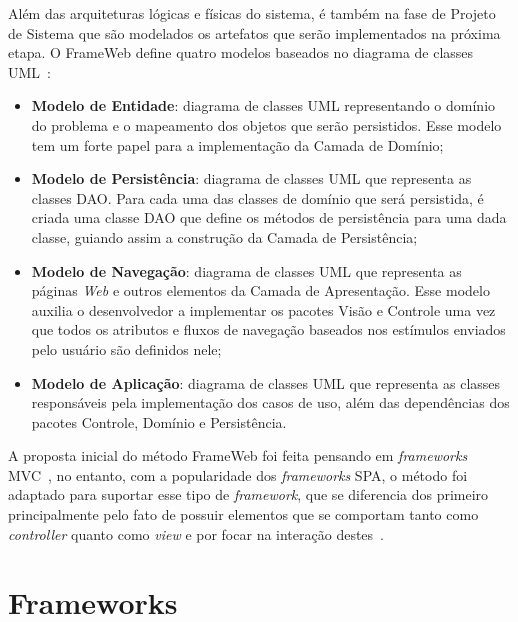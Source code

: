 Além das arquiteturas lógicas e físicas do sistema, é também na fase de Projeto de Sistema
que são modelados os artefatos que serão implementados na próxima etapa. O FrameWeb define
quatro modelos baseados no diagrama de classes UML~\cite{souza:2007,souza:2020}:


\begin{itemize}
    \item \textbf{Modelo de Entidade}: diagrama de classes UML representando o domínio do 
        problema e o mapeamento dos objetos que serão persistidos. Esse modelo tem um forte
        papel para a implementação da Camada de Domínio;

    \item \textbf{Modelo de Persistência}: diagrama de classes UML que representa as classes
        DAO. Para cada uma das classes de domínio que será persistida, é criada uma classe DAO
        que define os métodos de persistência para uma dada classe, guiando assim a 
        construção da Camada de Persistência;
    
    \item \textbf{Modelo de Navegação}: diagrama de classes UML que representa as páginas \textit{Web}
        e outros elementos da Camada de Apresentação. Esse modelo auxilia o desenvolvedor a
        implementar os pacotes Visão e Controle uma vez que todos os atributos e fluxos de 
        navegação baseados nos estímulos enviados pelo usuário são definidos nele;

    \item \textbf{Modelo de Aplicação}: diagrama de classes UML que representa as classes
        responsáveis pela implementação dos casos de uso, além das dependências dos pacotes
        Controle, Domínio e Persistência.
\end{itemize}

A proposta inicial do método FrameWeb foi feita pensando em \textit{frameworks} MVC~\cite{souza:2007},
no entanto, com a popularidade dos \textit{frameworks} SPA, o método foi adaptado para suportar
esse tipo de \textit{framework}, que se diferencia dos primeiro principalmente pelo fato de possuir elementos que se comportam tanto como \textit{controller} quanto como 
\textit{view} e por focar na interação destes~\cite{hoppe:2023}.


\section{Frameworks}
\label{sec-fundteo-framework}

